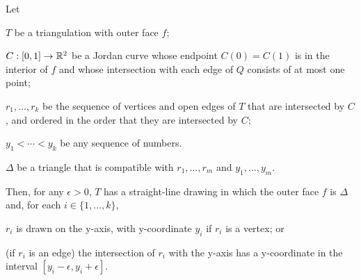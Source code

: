 \documentclass{patmorin}
\begin{document}
\begin{thm}
   Let
   \begin{compactenum}
     \item  $T$ be a triangulation with outer face $f$;
     \item  $C:[0,1]\to\mathbb{R}^2$ be a Jordan curve whose endpoint $C(0)=C(1)$
            is in the interior of $f$ and whose intersection with each
            edge of $Q$ consists of at most one point;
     \item $r_1,\ldots,r_k$ be the sequence of vertices and open edges
           of $T$ that are intersected by $C$, and ordered in the order
           that they are intersected by $C$;
     \item $y_1<\cdots<y_k$ be any sequence of numbers.  
     \item $\Delta$ be a triangle that is compatible with 
           $r_1,\ldots,r_m$ and $y_1,\ldots,y_m$.
  \end{compactenum}
   Then, for any $\epsilon>0$, $T$ has a
   straight-line drawing in which the outer face $f$ is $\Delta$
   and, for each $i\in\{1,\ldots,k\}$, 
   \begin{compactenum}
       \item $r_i$ is drawn on the y-axis, with y-coordinate $y_i$
         if $r_i$ is a vertex; or
       \item (if $r_i$ is an edge) the intersection of $r_i$ with the
         y-axis has a y-coordinate in the interval
         $[y_i-\epsilon,y_i+\epsilon]$.
   \end{compactenum}
\end{thm}
\end{document}

